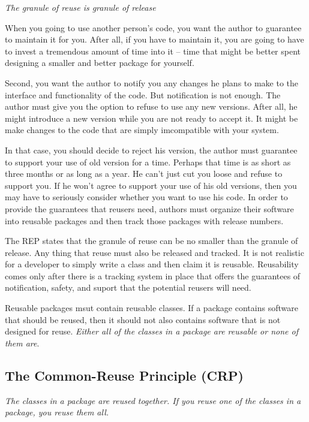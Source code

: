 \documentclass[12pt]{report}
\newcommand\tab[1][1cm]{\hspace*{#1}}
\begin{document}
\tab \textit{The granule of reuse is granule of release}
\cite{reuse-release}

When you going to use another person's code, you want the author 
to guarantee to maintain it for you. 
After all, if you have to maintain it, you are going to have to invest
a tremendous amount of time into it -- time that might be better
spent designing a smaller and better package for yourself.

Second, you want the author to notify you any changes he plans to make 
to the interface and functionality of the code. 
But notification is not enough. The author must give you the option to 
refuse to use any new versions. 
After all, he might introduce a new version 
while you are not ready to accept it. It might be make changes to the code 
that are simply imcompatible with your system. 

In that case, you should decide to reject his version, the author
must guarantee to support your use of old version for a time. 
Perhaps that time is as short as three months or as long as a year. 
He can't just cut you loose and refuse to support you. If he won't agree to support your use of his old versions, then you may have to seriously consider whether you want to use his code.
In order to provide the guarantees that reusers need, authors must organize their software into reusable packages and then track those packages with release numbers.

The REP states that the granule of reuse 
can be no smaller than the granule of release. 
Any thing that reuse must also be released and tracked. 
It is not realistic for a developer to simply write a class and 
then claim it is reusable. 
Reusability comes only after there is a tracking system in place that offers the guarantees of 
notification, safety, and suport that the potential reusers will need. 

Reusable packages msut contain reusable classes. If a package contains software that 
should be reused, then it should not also contains software that is not designed for reuse. \textit{Either all of the classes in a package are reusable or none of them are}.

\subsection{The Common-Reuse Principle (CRP)}

\tab \textit{The classes in a package are reused together. If you reuse one of the classes in a package, you reuse them all.}
\end{document}
